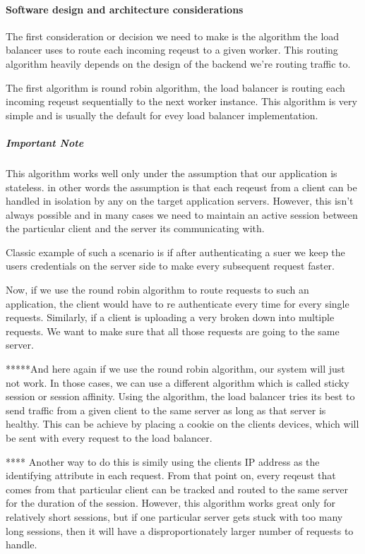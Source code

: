 \documentclass[a4paper, 11pt]{book}
\begin{document}
    \paragraph{Software design and architecture considerations}
    The first consideration or decision we need to make is the algorithm the load balancer uses to route each incoming reqeust to a given worker.
    This routing algorithm heavily depends on the design of the backend we're routing traffic to.

    The first algorithm is round robin algorithm, the load balancer is routing each incoming reqeust sequentially to the next worker instance.
    This algorithm is very simple and is usually the default for evey load balancer implementation.

    \subparagraph{Important Note} This algorithm works well only under the assumption that our application is stateless.
    in other words the assumption is that each reqeust from a client can be handled in isolation by any on the target application servers.
    However, this isn't always possible and in many cases we need to maintain an active session between the particular client and the server its communicating with.

    Classic example of such a scenario is if after authenticating a suer we keep the users credentials on the server side to make every subsequent request faster.

    Now, if we use the round robin algorithm to route requests to such an application, the client would have to re authenticate every time for every single requests.
    Similarly, if a client is uploading a very broken down into multiple requests.
    We want to make sure that all those requests are going to the same server.

    *****And here again if we use the round robin algorithm, our system will just not work.
    In those cases, we can use a different algorithm which is called sticky session or session affinity.
    Using the algorithm, the load balancer tries its best to send traffic from a given client to the same server as long as that server is healthy.
    This can be achieve by placing a cookie on the clients devices, which will be sent with every request to the load balancer.


    **** Another way to do this is simily using the clients IP address as the identifying attribute in each request.
    From that point on, every reqeust that comes from that particular client can be tracked and routed to the same server for the duration of the session.
    However, this algorithm works great only for relatively short sessions, but if one particular server gets stuck with too many long sessions, then it will have a disproportionately larger number of requests to handle.
\end{document}
